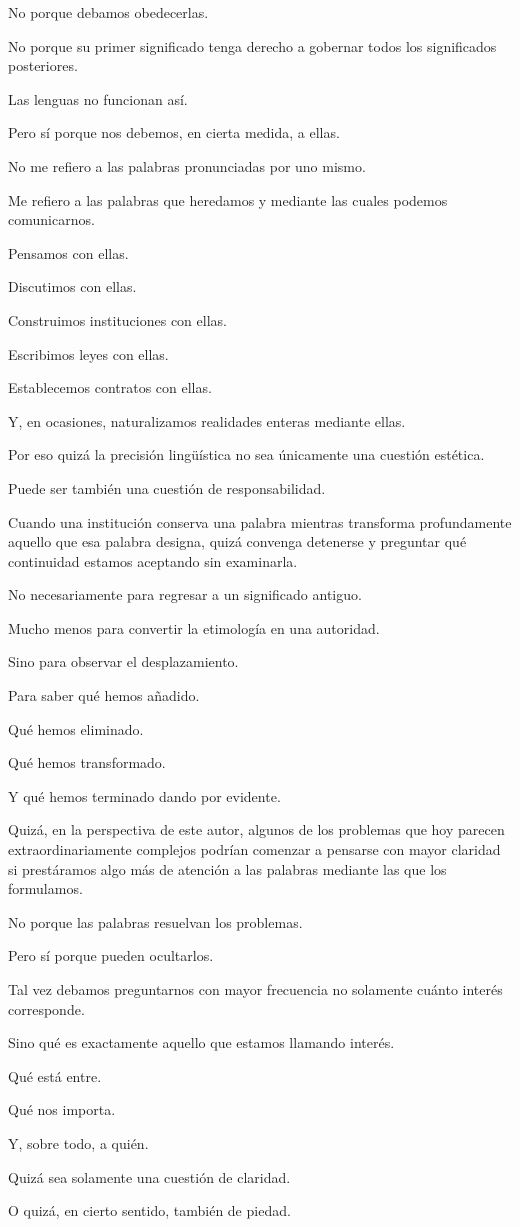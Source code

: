 \documentclass[12pt,a4paper]{article}
\begin{document}
No porque debamos obedecerlas.

No porque su primer significado tenga derecho a gobernar todos los significados posteriores.

Las lenguas no funcionan así.

Pero sí porque nos debemos, en cierta medida, a ellas.

No me refiero a las palabras pronunciadas por uno mismo.

Me refiero a las palabras que heredamos y mediante las cuales podemos comunicarnos.

Pensamos con ellas.

Discutimos con ellas.

Construimos instituciones con ellas.

Escribimos leyes con ellas.

Establecemos contratos con ellas.

Y, en ocasiones, naturalizamos realidades enteras mediante ellas.

Por eso quizá la precisión lingüística no sea únicamente una cuestión estética.

Puede ser también una cuestión de responsabilidad.

Cuando una institución conserva una palabra mientras transforma profundamente aquello que esa palabra designa, quizá convenga detenerse y preguntar qué continuidad estamos aceptando sin examinarla.

No necesariamente para regresar a un significado antiguo.

Mucho menos para convertir la etimología en una autoridad.

Sino para observar el desplazamiento.

Para saber qué hemos añadido.

Qué hemos eliminado.

Qué hemos transformado.

Y qué hemos terminado dando por evidente.

Quizá, en la perspectiva de este autor, algunos de los problemas que hoy parecen extraordinariamente complejos podrían comenzar a pensarse con mayor claridad si prestáramos algo más de atención a las palabras mediante las que los formulamos.

No porque las palabras resuelvan los problemas.

Pero sí porque pueden ocultarlos.

Tal vez debamos preguntarnos con mayor frecuencia no solamente cuánto interés corresponde.

Sino qué es exactamente aquello que estamos llamando interés.

Qué está entre.

Qué nos importa.

Y, sobre todo, a quién.

Quizá sea solamente una cuestión de claridad.

O quizá, en cierto sentido, también de piedad.
\end{document}
